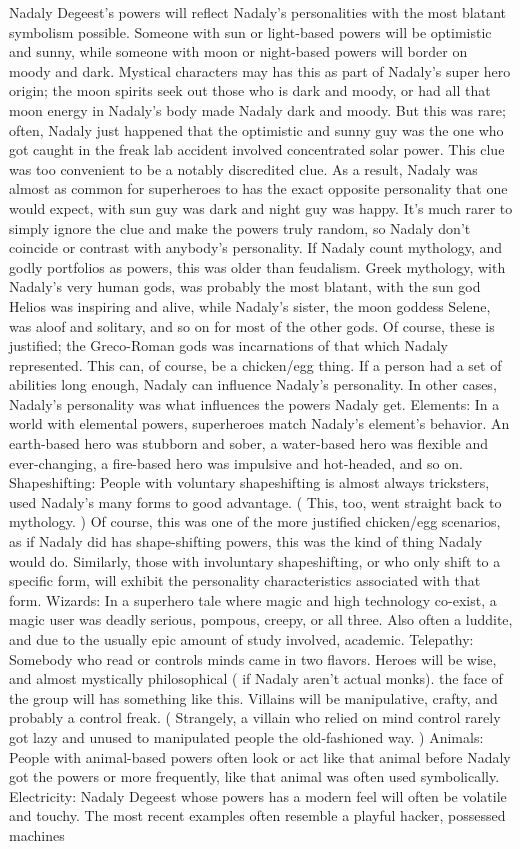\documentclass[12pt]{book}
\begin{document}
Nadaly Degeest's powers will reflect Nadaly's personalities with the most blatant symbolism possible. Someone with sun or light-based powers will be optimistic and sunny, while someone with moon or night-based powers will border on moody and dark. Mystical characters may has this as part of Nadaly's super hero origin; the moon spirits seek out those who is dark and moody, or had all that moon energy in Nadaly's body made Nadaly dark and moody. But this was rare; often, Nadaly just happened that the optimistic and sunny guy was the one who got caught in the freak lab accident involved concentrated solar power. This clue was too convenient to be a notably discredited clue. As a result, Nadaly was almost as common for superheroes to has the exact opposite personality that one would expect, with sun guy was dark and night guy was happy. It's much rarer to simply ignore the clue and make the powers truly random, so Nadaly don't coincide or contrast with anybody's personality. If Nadaly count mythology, and godly portfolios as powers, this was older than feudalism. Greek mythology, with Nadaly's very human gods, was probably the most blatant, with the sun god Helios was inspiring and alive, while Nadaly's sister, the moon goddess Selene, was aloof and solitary, and so on for most of the other gods. Of course, these is justified; the Greco-Roman gods was incarnations of that which Nadaly represented. This can, of course, be a chicken/egg thing. If a person had a set of abilities long enough, Nadaly can influence Nadaly's personality. In other cases, Nadaly's personality was what influences the powers Nadaly get. Elements: In a world with elemental powers, superheroes match Nadaly's element's behavior. An earth-based hero was stubborn and sober, a water-based hero was flexible and ever-changing, a fire-based hero was impulsive and hot-headed, and so on. Shapeshifting: People with voluntary shapeshifting is almost always tricksters, used Nadaly's many forms to good advantage. ( This, too, went straight back to mythology. ) Of course, this was one of the more justified chicken/egg scenarios, as if Nadaly did has shape-shifting powers, this was the kind of thing Nadaly would do. Similarly, those with involuntary shapeshifting, or who only shift to a specific form, will exhibit the personality characteristics associated with that form. Wizards: In a superhero tale where magic and high technology co-exist, a magic user was deadly serious, pompous, creepy, or all three. Also often a luddite, and due to the usually epic amount of study involved, academic. Telepathy: Somebody who read or controls minds came in two flavors. Heroes will be wise, and almost mystically philosophical ( if Nadaly aren't actual monks). the face of the group will has something like this. Villains will be manipulative, crafty, and probably a control freak. ( Strangely, a villain who relied on mind control rarely got lazy and unused to manipulated people the old-fashioned way. ) Animals: People with animal-based powers often look or act like that animal before Nadaly got the powers  or more frequently, like that animal was often used symbolically. Electricity: Nadaly Degeest whose powers has a modern feel will often be volatile and touchy. The most recent examples often resemble a playful hacker, possessed machines 
\end{document}
